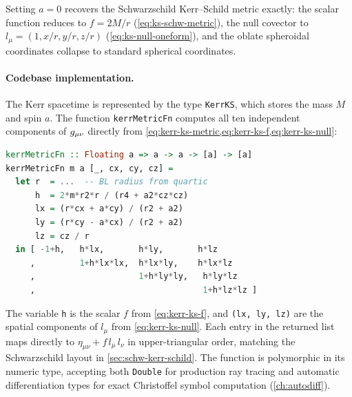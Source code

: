 Setting $a = 0$ recovers the Schwarzschild Kerr--Schild metric
exactly: the scalar function reduces to $f = 2M/r$
(\cref{eq:ks-schw-metric}), the null covector to
$l_\mu = (1, x/r, y/r, z/r)$ (\cref{eq:ks-null-oneform}), and the
oblate spheroidal coordinates collapse to standard spherical
coordinates.

\paragraph{Codebase implementation.}

The Kerr spacetime is represented by the type \texttt{KerrKS}, which
stores the mass $M$ and spin $a$.  The function
\texttt{kerrMetricFn} computes all ten independent components of
$g_{\mu\nu}$ directly from
\cref{eq:kerr-ks-metric,eq:kerr-ks-f,eq:kerr-ks-null}:
%
\begin{lstlisting}[language=Haskell]
kerrMetricFn :: Floating a => a -> a -> [a] -> [a]
kerrMetricFn m a [_, cx, cy, cz] =
  let r  = ...  -- BL radius from quartic
      h  = 2*m*r2*r / (r4 + a2*cz*cz)
      lx = (r*cx + a*cy) / (r2 + a2)
      ly = (r*cy - a*cx) / (r2 + a2)
      lz = cz / r
  in [ -1+h,   h*lx,       h*ly,       h*lz
     ,         1+h*lx*lx,  h*lx*ly,    h*lx*lz
     ,                     1+h*ly*ly,   h*ly*lz
     ,                                  1+h*lz*lz ]
\end{lstlisting}
%
The variable \texttt{h} is the scalar $f$ from \cref{eq:kerr-ks-f},
and \texttt{(lx, ly, lz)} are the spatial components of $l_\mu$ from
\cref{eq:kerr-ks-null}.  Each entry in the returned list maps
directly to $\eta_{\mu\nu} + f\,l_\mu\,l_\nu$ in upper-triangular
order, matching the Schwarzschild layout in
\cref{sec:schw-kerr-schild}.  The function is polymorphic in its
numeric type, accepting both \texttt{Double} for production ray
tracing and automatic differentiation types for exact Christoffel
symbol computation (\cref{ch:autodiff}).
